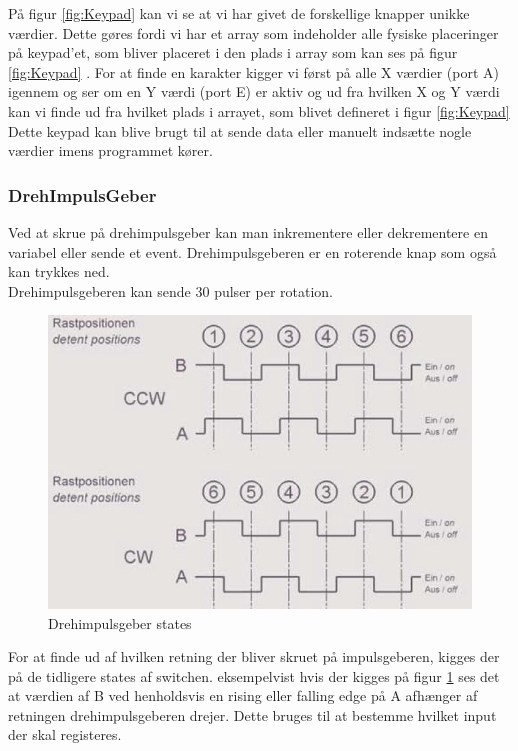 På figur \ref{fig:Keypad} kan vi se at vi har givet de forskellige knapper unikke værdier. Dette gøres fordi vi har et array som indeholder alle fysiske placeringer på keypad’et, som bliver placeret i den plads i array som kan ses på figur \ref{fig:Keypad} . For at finde en karakter kigger vi først på alle X værdier (port A) igennem og ser om en Y værdi (port E) er aktiv og ud fra hvilken X og Y værdi kan vi finde ud fra hvilket plads i arrayet, som blivet defineret i figur \ref{fig:Keypad}
\\
Dette keypad kan blive brugt til at sende data eller manuelt indsætte nogle værdier imens programmet kører.



\subsubsection{DrehImpulsGeber}

Ved at skrue på drehimpulsgeber kan man inkrementere eller dekrementere en variabel eller sende et event.
Drehimpulsgeberen er en roterende knap som også kan trykkes ned.\\
Drehimpulsgeberen kan sende 30 pulser per rotation.

\begin{figure}[ht]
			\begin{center}
			\includegraphics[scale=0.40]{Billeder/DrehImpulsGeber_events.jpg}
			\end{center}
			\caption{Drehimpulsgeber states}
			\label{fig:Impulsgeber}
		\end{figure}

For at finde ud af hvilken retning der bliver skruet på impulsgeberen, kigges der på de tidligere states af switchen.
eksempelvist hvis der kigges på figur \ref{fig:Impulsgeber} ses det at værdien af B ved henholdsvis en rising eller falling edge på A afhænger af retningen drehimpulsgeberen drejer. Dette bruges til at bestemme hvilket input der skal registeres.


